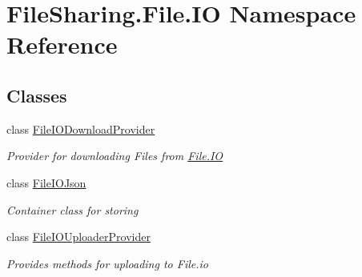 \hypertarget{namespace_file_sharing_1_1_file_1_1_i_o}{}\section{File\+Sharing.\+File.\+IO Namespace Reference}
\label{namespace_file_sharing_1_1_file_1_1_i_o}
\subsection*{Classes}
\begin{DoxyCompactItemize}
\item 
class \hyperlink{class_file_sharing_1_1_file_1_1_i_o_1_1_file_i_o_download_provider}{File\+I\+O\+Download\+Provider}
\begin{DoxyCompactList}\small\item\em Provider for downloading Files from \hyperlink{namespace_file_sharing_1_1_file_1_1_i_o}{File.\+IO} \end{DoxyCompactList}\item 
class \hyperlink{class_file_sharing_1_1_file_1_1_i_o_1_1_file_i_o_json}{File\+I\+O\+Json}
\begin{DoxyCompactList}\small\item\em Container class for storing \end{DoxyCompactList}\item 
class \hyperlink{class_file_sharing_1_1_file_1_1_i_o_1_1_file_i_o_uploader_provider}{File\+I\+O\+Uploader\+Provider}
\begin{DoxyCompactList}\small\item\em Provides methods for uploading to File.\+io \end{DoxyCompactList}\end{DoxyCompactItemize}
